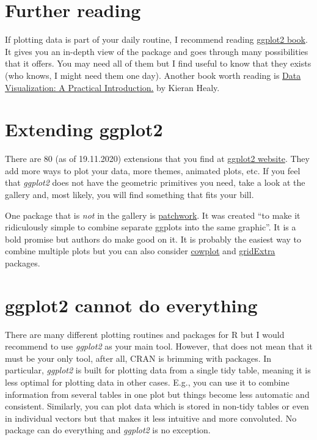 \documentclass[
]{book}
\begin{document}
\hypertarget{further-reading}{%
\section{Further reading}\label{further-reading}}

If plotting data is part of your daily routine, I recommend reading \href{https://ggplot2-book.org/}{ggplot2 book}. It gives you an in-depth view of the package and goes through many possibilities that it offers. You may need all of them but I find useful to know that they exists (who knows, I might need them one day). Another book worth reading is \href{https://kieranhealy.org/publications/dataviz/}{Data Visualization: A Practical Introduction.} by Kieran Healy.

\hypertarget{extending-ggplot2}{%
\section{Extending ggplot2}\label{extending-ggplot2}}

There are 80 (as of 19.11.2020) extensions that you find at \href{https://exts.ggplot2.tidyverse.org/gallery/}{ggplot2 website}. They add more ways to plot your data, more themes, animated plots, etc. If you feel that \emph{ggplot2} does not have the geometric primitives you need, take a look at the gallery and, most likely, you will find something that fits your bill.

One package that is \emph{not} in the gallery is \href{https://patchwork.data-imaginist.com/}{patchwork}. It was created ``to make it ridiculously simple to combine separate ggplots into the same graphic''. It is a bold promise but authors do make good on it. It is probably the easiest way to combine multiple plots but you can also consider \href{https://github.com/wilkelab/cowplot}{cowplot} and \href{https://cran.r-project.org/web/packages/gridExtra/index.html}{gridExtra} packages.

\hypertarget{ggplot2-cannot-do-everything}{%
\section{ggplot2 cannot do everything}\label{ggplot2-cannot-do-everything}}

There are many different plotting routines and packages for R but I would recommend to use \emph{ggplot2} as your main tool. However, that does not mean that it must be your only tool, after all, CRAN is brimming with packages. In particular, \emph{ggplot2} is built for plotting data from a single tidy table, meaning it is less optimal for plotting data in other cases. E.g., you can use it to combine information from several tables in one plot but things become less automatic and consistent. Similarly, you can plot data which is stored in non-tidy tables or even in individual vectors but that makes it less intuitive and more convoluted. No package can do everything and \emph{ggplot2} is no exception.

  
\end{document}
